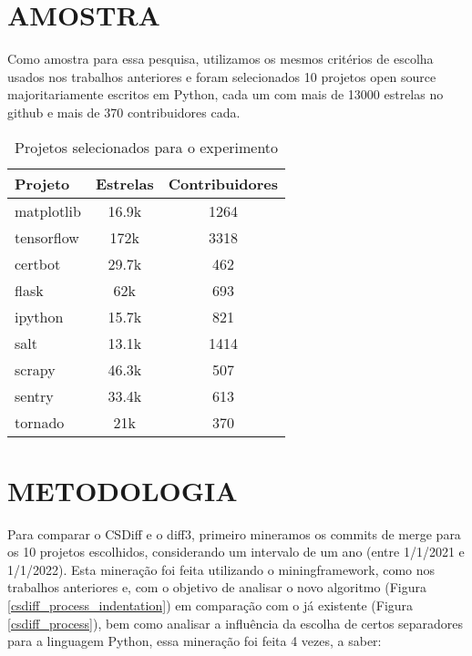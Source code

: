 \section{AMOSTRA}
Como amostra para essa pesquisa, utilizamos os mesmos critérios de escolha
usados nos trabalhos anteriores e foram selecionados 10 projetos open source majoritariamente escritos em Python,
cada um com mais de 13000 estrelas no github e mais de 370 contribuidores cada.

\begin{table}[ht]
	\begin{center}
		\begin{tabular}{|l|c|c|}
			\hline
			\textbf{Projeto} & \textbf{Estrelas} & \textbf{Contribuidores} \\
			\hline
			matplotlib       & 16.9k             & 1264                    \\
			tensorflow       & 172k              & 3318                    \\
			certbot          & 29.7k             & 462                     \\
			flask            & 62k               & 693                     \\
			ipython          & 15.7k             & 821                     \\
			salt             & 13.1k             & 1414                    \\
			scrapy           & 46.3k             & 507                     \\
			sentry           & 33.4k             & 613                     \\
			tornado          & 21k               & 370                     \\
			\hline
		\end{tabular}
	\end{center}
	\caption{Projetos selecionados para o experimento}\label{tabela_projeto}
\end{table}

\section{METODOLOGIA}\label{metodologia}
Para comparar o CSDiff e o diff3, primeiro mineramos os commits de merge para os 10 projetos escolhidos, considerando um
intervalo de um ano (entre 1/1/2021 e 1/1/2022). Esta mineração foi feita utilizando o miningframework, como nos trabalhos
anteriores e, com o objetivo de analisar o novo algoritmo (Figura \ref{csdiff_process_indentation}) em comparação com o já
existente (Figura \ref{csdiff_process}), bem como analisar a influência da escolha de certos separadores para a linguagem Python,
essa mineração foi feita 4 vezes, a saber:

